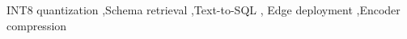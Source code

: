 \documentclass[a4paper,fleqn]{cas-dc}
\begin{document}
\begin{keywords}
INT8 quantization \sep Schema retrieval \sep Text-to-SQL \sep
Edge deployment \sep Encoder compression
\end{keywords}

\maketitle












\appendix

\end{document}
